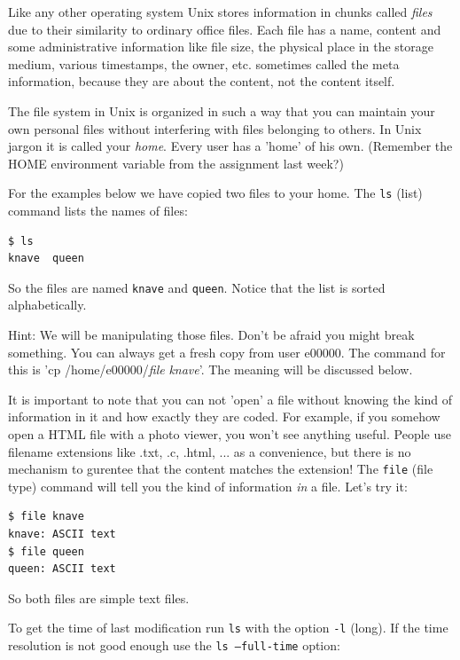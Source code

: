 \documentclass[11pt,a4paper,twoside]{article}
\begin{document}
Like any other operating system Unix stores information in chunks called 
\emph{files} due to their similarity to ordinary office files.  Each file 
has a name, content and some administrative information like file size, 
the physical place in the storage medium, various timestamps, the owner, 
etc. sometimes called the meta information, because they are about the 
content, not the content itself.

The file system in Unix is organized in such a way that you can maintain 
your own personal files without interfering with files belonging to others. 
In Unix jargon it is called your \emph{home}. Every user has a 'home' of
his own. (Remember the HOME environment variable from the assignment last
week?) 

For the examples below we have copied two files to your home. The \texttt{ls} 
(list) command lists the names of files:

\begin{lstlisting}[frame=single]
$ ls
knave  queen
\end{lstlisting}

So the files are named \texttt{knave} and \texttt{queen}. Notice that
the list is sorted alphabetically.

Hint: We will be manipulating those files. Don't be afraid you might break
something. You can always get a fresh copy from user e00000. The command for
this is 'cp /home/e00000/\emph{file} \emph{knave}'. The meaning will be 
discussed below.

It is important to note that you can not 'open' a file without knowing the 
kind of information in it and how exactly they are coded. For example, if 
you somehow open a HTML file with a photo viewer, you won't see anything 
useful. People use filename extensions like .txt, .c, .html, ... as a 
convenience, but there is no mechanism to gurentee that the content matches 
the extension! The \texttt{file} (file type) command will tell you the kind 
of information \emph{in} a file. Let's try it:

\begin{lstlisting}[frame=single]
$ file knave
knave: ASCII text
$ file queen
queen: ASCII text
\end{lstlisting}

So both files are simple text files.

To get the time of last modification run \texttt{ls} with the option 
\texttt{-l} (long). If the time resolution is not good enough use the 
\texttt{ls --full-time} option:
\end{document}
